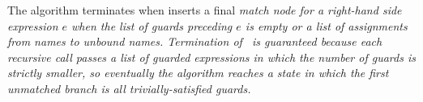 \documentclass[manuscript,screen,review, 12pt, nonacm]{acmart}
\begin{document}


    The algorithm terminates when inserts a final \it{match} node for a
    right-hand side expression $e$ when the list of guards preceding $e$ is
    empty or a list of assignments from names to unbound names. Termination of
    \DTran\ is guaranteed because each recursive call passes a list of guarded
    expressions in which the number of guards is strictly smaller, so eventually
    the algorithm reaches a state in which the first unmatched branch is all
    trivially-satisfied guards. 

       
\end{document}
